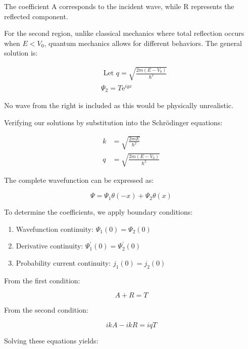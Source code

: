 \documentclass[10pt]{article}
\begin{document}
The coefficient A corresponds to the incident wave, while R represents the reflected component.

For the second region, unlike classical mechanics where total reflection occurs when $E < V_0$, quantum mechanics allows for different behaviors. The general solution is:

\begin{align*}
& \text { Let } q=\sqrt{\frac{2 m\left(E-V_{0}\right)}{\hbar^{2}}}  \tag{6.12}\\
& \Psi_{2}=T \mathrm{e}^{i q x}
\end{align*}

No wave from the right is included as this would be physically unrealistic.

Verifying our solutions by substitution into the Schrödinger equations:

\begin{align*}
k & =\sqrt{\frac{2 m E}{\hbar^{2}}}  \tag{6.13}\\
q & =\sqrt{\frac{2 m\left(E-V_{0}\right)}{\hbar^{2}}}
\end{align*}

The complete wavefunction can be expressed as:

\begin{equation*}
\Psi=\Psi_{1} \theta(-x)+\Psi_{2} \theta(x) \tag{6.14}
\end{equation*}

To determine the coefficients, we apply boundary conditions:

\begin{enumerate}
  \item Wavefunction continuity: $\Psi_{1}(0)=\Psi_{2}(0)$
  \item Derivative continuity: $\Psi_{1}^{\prime}(0)=\Psi_{2}^{\prime}(0)$
  \item Probability current continuity: $j_{1}(0)=j_{2}(0)$
\end{enumerate}

From the first condition:

\begin{equation*}
A+R=T \tag{6.15}
\end{equation*}

From the second condition:

\begin{equation*}
i k A-i k R=i q T \tag{6.16}
\end{equation*}

Solving these equations yields:
\end{document}

